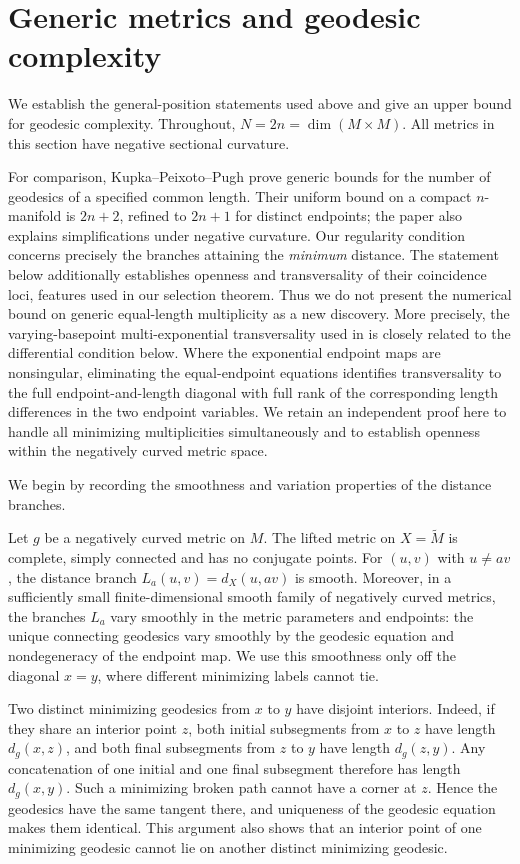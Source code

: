 \section{Generic metrics and geodesic complexity}
\label{sec:generic}

We establish the general-position statements used above and
give an upper bound for geodesic complexity.
Throughout, $N=2n=\dim(M\times M)$.
All metrics in this section have negative sectional curvature.

For comparison, Kupka--Peixoto--Pugh
\cite[Theorem~1.2 and Section~7]{KupkaPeixotoPugh2006}
prove generic bounds for the number of geodesics
of a specified common length. Their uniform bound
on a compact $n$-manifold is $2n+2$, refined to
$2n+1$ for distinct endpoints; the paper also
explains simplifications under negative curvature.
Our regularity condition concerns precisely
the branches attaining the \emph{minimum}
distance. The statement below additionally
establishes openness and transversality of
their coincidence loci, features used in our
selection theorem. Thus we do not present
the numerical bound on generic equal-length
multiplicity as a new discovery.
More precisely, the varying-basepoint
multi-exponential transversality used in
\cite[Section~7]{KupkaPeixotoPugh2006}
is closely related to the differential
condition below. Where the exponential
endpoint maps are nonsingular, eliminating
the equal-endpoint equations identifies
transversality to the full endpoint-and-length
diagonal with full rank of the corresponding
length differences in the two endpoint variables.
We retain an independent proof here to handle
all minimizing multiplicities simultaneously
and to establish openness within the
negatively curved metric space.

We begin by recording the smoothness and variation properties of the distance branches.

Let $g$ be a negatively curved metric on $M$.
The lifted metric on $X=\widetilde M$ is complete,
simply connected and has no conjugate points.
For $(u,v)$ with $u\ne av$, the distance branch
$L_a(u,v)=d_X(u,av)$ is smooth.
Moreover, in a sufficiently small finite-dimensional
smooth family of negatively curved metrics, the branches
$L_a$ vary smoothly in the metric parameters and endpoints:
the unique connecting geodesics vary smoothly by the
geodesic equation and nondegeneracy of the endpoint map.
We use this smoothness only off the diagonal $x=y$,
where different minimizing labels cannot tie.

Two distinct minimizing geodesics from $x$ to $y$
have disjoint interiors. Indeed, if they share an
interior point $z$, both initial subsegments from
$x$ to $z$ have length $d_g(x,z)$, and both final
subsegments from $z$ to $y$ have length $d_g(z,y)$.
Any concatenation of one initial and one final
subsegment therefore has length $d_g(x,y)$.
Such a minimizing broken path cannot have a corner
at $z$. Hence the geodesics have the same tangent
there, and uniqueness of the geodesic equation
makes them identical. This argument also shows
that an interior point of one minimizing geodesic
cannot lie on another distinct minimizing geodesic.

